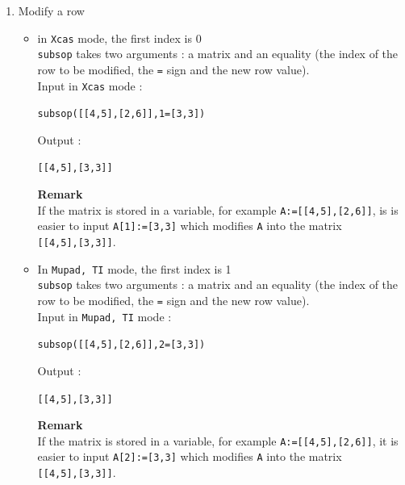 \documentclass[a4paper,11pt]{book}
\begin{document}
\begin{enumerate}
\begin{itemize}
\item In {\tt Maple} mode, 
the arguments are permuted and the first index is 1\\
{\tt subsop} has two arguments: an equality {\tt [r,c]=v} and a matrix 
{\tt A}.\\
{\tt subsop} replaces the element {\tt A[r,c]} by {\tt v}.\\
Input in {\tt Maple} mode
\begin{center}{\tt subsop([2,1]=3,[[4,5],[2,6]])}\end{center}
Output :
\begin{center}{\tt [[4,5],[3,6]]}\end{center}
{\bf Remark}\\
If the matrix is stored in a variable, for example 
{\tt A:=[[4,5],[2,6]]}, it is easier to input {\tt A[2,1]:=3} which
modifies {\tt A} into the matrix\\ {\tt [[4,5],[3,6]]}.
\end{itemize}

\item Modify a row
\begin{itemize}
\item in {\tt Xcas} mode, the first index is 0\\ 
{\tt subsop} takes two arguments : a matrix and an 
equality (the index of the row to be modified, the {\tt =} sign and the new 
row value).\\ 
Input in {\tt Xcas} mode  :
\begin{center}{\tt subsop([[4,5],[2,6]],1=[3,3])}\end{center}
Output :
\begin{center}{\tt [[4,5],[3,3]]}\end{center}
{\bf Remark}\\
If the matrix is stored in a variable, for example 
{\tt A:=[[4,5],[2,6]]}, is is easier to input {\tt A[1]:=[3,3]}
which modifies {\tt A} into the matrix\\ {\tt [[4,5],[3,3]]}.

\item In {\tt Mupad, TI} mode, the first index is 1 \\
{\tt subsop} takes two arguments : a matrix and an 
equality (the index of the row to be modified, the {\tt =} sign and  the new 
row value).\\ 
Input in {\tt Mupad, TI} mode :
\begin{center}{\tt subsop([[4,5],[2,6]],2=[3,3])}\end{center}
Output :
\begin{center}{\tt [[4,5],[3,3]]}\end{center}
{\bf Remark}\\
If the matrix is stored in a variable, for example 
{\tt A:=[[4,5],[2,6]]}, it is easier to input {\tt A[2]:=[3,3]} which modifies
{\tt A} into the matrix\\ {\tt [[4,5],[3,3]]}.


\end{itemize}
\end{enumerate}
\end{document}
